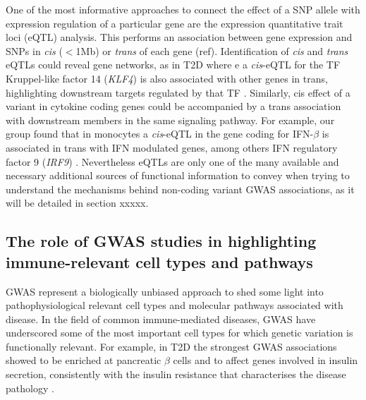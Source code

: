 One of the most informative approaches to connect the effect of a SNP allele with expression regulation of a particular gene are the expression quantitative trait loci (eQTL) analysis. This performs an association between gene expression and SNPs in \textit{cis} ($<$1Mb) or \textit{trans} of each gene (ref). Identification of \textit{cis} and \textit{trans} eQTLs could reveal gene networks, as in T2D where e a \textit{cis}-eQTL for the TF Kruppel-like factor 14 (\textit{KLF4}) is also associated with other genes in trans, highlighting downstream targets regulated by that TF \parencite{Small2011}. Similarly, cis effect of a variant in cytokine coding genes could be accompanied by a trans association with downstream members in the same signaling pathway. For example, our group found that in monocytes a \textit{cis}-eQTL in the gene coding for IFN-$\beta$ is associated in trans with IFN modulated genes, among others IFN regulatory factor 9 (\textit{IRF9}) \parencite{Fairfax2014}. Nevertheless eQTLs are only one of the many available and necessary additional sources of functional information to convey when trying to understand the mechanisms behind non-coding variant GWAS associations, as it will be detailed in section xxxxx.  



\subsection{The role of GWAS studies in highlighting immune-relevant cell types and pathways}

GWAS represent a biologically unbiased approach to shed some light into pathophysiological relevant cell types and molecular pathways associated with disease. In the field of common immune-mediated diseases, GWAS have underscored some of the most important cell types for which genetic variation is functionally relevant. For example, in T2D the strongest GWAS associations showed to be enriched at pancreatic $\beta$ cells and to affect genes involved in insulin secretion, consistently with the insulin resistance that characterises the disease pathology \parencite{Visscher2017}.

